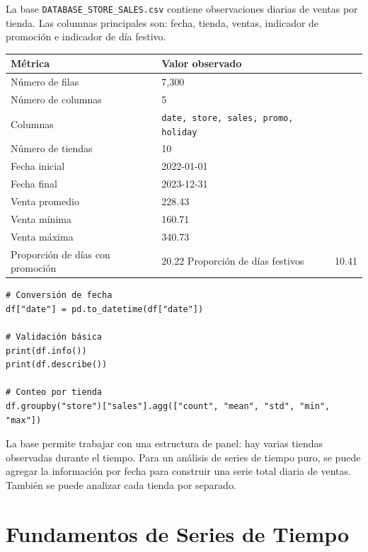 \documentclass[12pt,a4paper]{article}
\begin{document}
\begin{markdowncell}
La base \texttt{DATABASE\_STORE\_SALES.csv} contiene observaciones diarias de ventas por tienda. Las columnas principales son: fecha, tienda, ventas, indicador de promoción e indicador de día festivo.
\end{markdowncell}

\begin{longtable}{p{5cm}p{8cm}}
\toprule
\textbf{Métrica} & \textbf{Valor observado} \\
\midrule
\endhead
Número de filas & 7,300 \\
Número de columnas & 5 \\
Columnas & \texttt{date, store, sales, promo, holiday} \\
Número de tiendas & 10 \\
Fecha inicial & 2022-01-01 \\
Fecha final & 2023-12-31 \\
Venta promedio & 228.43 \\
Venta mínima & 160.71 \\
Venta máxima & 340.73 \\
Proporción de días con promoción & 20.22%
Proporción de días festivos & 10.41%
\bottomrule
\end{longtable}

\begin{lstlisting}[style=pythonstyle]
# Conversión de fecha
df["date"] = pd.to_datetime(df["date"])

# Validación básica
print(df.info())
print(df.describe())

# Conteo por tienda
df.groupby("store")["sales"].agg(["count", "mean", "std", "min", "max"])
\end{lstlisting}

\begin{interpretacion}
La base permite trabajar con una estructura de panel: hay varias tiendas observadas durante el tiempo. Para un análisis de series de tiempo puro, se puede agregar la información por fecha para construir una serie total diaria de ventas. También se puede analizar cada tienda por separado.
\end{interpretacion}

\section{Fundamentos de Series de Tiempo}
\end{document}
